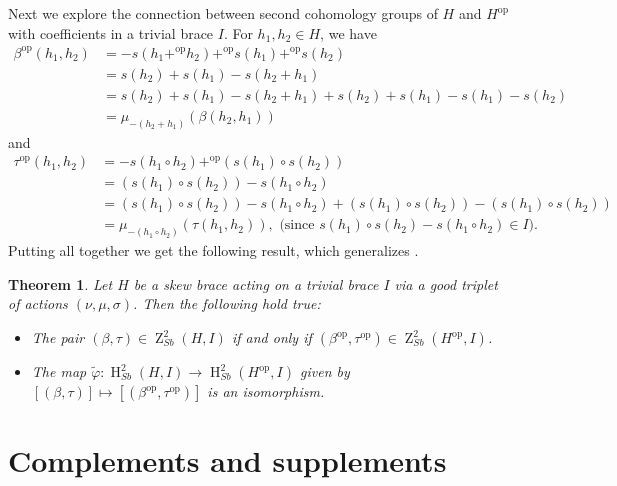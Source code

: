 \documentclass[11pt]{amsart}
\theoremstyle{thrm}
\theoremstyle{plain}
\newtheorem{thm}{Theorem}[section]
\theoremstyle{definition}
\newcommand{\Ho}{\operatorname{H} }
\newcommand{\Z}{\operatorname{Z} }
\numberwithin{equation}{section}
\newcommand{\op}{\operatorname{op} }
\begin{document}
Next we explore the connection between second cohomology groups of $H$ and $H^{\op}$ with coefficients in a trivial brace $I$. For $h_1, h_2 \in H$, we have
\begin{align*}
\beta^{\op}(h_1, h_2) & = -s(h_1+^{\op}h_2)+^{\op} s(h_1) +^{\op}s(h_2)\\
& =s(h_2)+s(h_1) -s(h_2+h_1)\\
& =s(h_2)+s(h_1) -s(h_2+h_1)+s(h_2)+s(h_1)-s(h_1)-s(h_2)\\
&= \mu_{-(h_2+h_1)}(\beta(h_2, h_1))
\end{align*}
and 
\begin{align*}
\tau^{\op}(h_1, h_2) & =-s(h_1 \circ h_2)+^{\op} (s(h_1) \circ s(h_2))\\
&=(s(h_1) \circ s(h_2)) - s(h_1 \circ h_2)\\
&= (s(h_1) \circ s(h_2)) -s(h_1 \circ h_2) + (s(h_1) \circ s(h_2)) - (s(h_1) \circ s(h_2))\\
&= \mu_{-(h_1 \circ h_2)}(\tau(h_1, h_2)), \mbox{ (since }s(h_1) \circ s(h_2) - s(h_1 \circ h_2) \in I).
\end{align*}
Putting all together we get the following result, which generalizes \cite[Theorem 1.37]{LV24}.
\begin{thm}
Let $H$ be a skew  brace acting on a  trivial brace $I$ via a good triplet of actions $(\nu, \mu, \sigma)$. Then the following hold true:
\begin{itemize}
\item[(i)] The pair $(\beta, \tau) \in \Z^2_{Sb}(H,I)$ if and only if  $(\beta^{\op}, \tau^{\op}) \in \Z^2_{Sb}(H^{\op},I)$.
\item[(ii)] The map $\tilde{\varphi}: \Ho^2_{Sb}(H, I) \rightarrow \Ho^2_{Sb}(H^{\op}, I)$ given by $[(\beta, \tau)] \mapsto [(\beta^{\op}, \tau^{\op})]$
is an isomorphism.
\end{itemize}
\end{thm}



\section{Complements and supplements}
\end{document}
